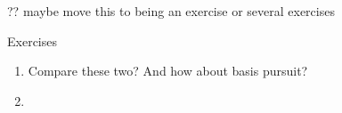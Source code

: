 ?? maybe move this to being an exercise or several exercises

\begin{xcb}{Exercises}
\begin{enumerate}[label=\thechapter.\arabic*]
\settowidth{\leftmargini}{00.00.\hskip\labelsep}
\item \label{ex:lasso_dantzig}
Compare these two? And how about basis pursuit?

\item \label{ex:simplex_projection}

\end{enumerate}
\end{xcb}